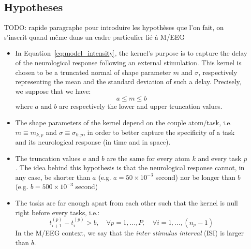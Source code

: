 \subsection{Hypotheses}

TODO: rapide paragraphe pour introduire les hypothèses que l'on fait, on s'inscrit quand même dans un cadre particulier lié à M/EEG

\begin{itemize}
    \item In Equation~\eqref{eq:model_intensity}, the kernel's purpose is to capture the delay of the neurological response following an external stimulation.
    This kernel is chosen to be a truncated normal of shape parameter $m$ and $\sigma$, respectively representing the mean and the standard deviation of such a delay.
    Precisely, we suppose that we have:
    \begin{equation}\label{eq:m_in_between}
        a \leq m \leq b
    \end{equation}
    where $a$ and $b$ are respectively the lower and upper truncation values.
    
    \item The shape parameters of the kernel depend on the couple atom/task, i.e. $m\equiv m_{k,p}$ and $\sigma \equiv \sigma_{k,p}$, in order to better capture the specificity of a task and its neurological response (in time and in space).
    
    \item The truncation values $a$ and $b$ are the same for every atom $k$ and every task $p$.
    The idea behind this hypothesis is that the neurological response cannot, in any case, be shorter than $a$ (e.g. $a = 50\times 10^{-3}$ second) nor be longer than $b$ (e.g. $b = 500\times 10^{-3}$ second)
    
    \item The tasks are far enough apart from each other such that the kernel is null right before every tasks, i.e.:
    \begin{equation}\label{eq:separated_timestamps}
        t_{i+1}^{(p)} - t_i^{(p)} > b, \quad \forall p=1,\dots,P, \quad \forall i=1,\dots, (n_p-1)
    \end{equation}
    In the M/EEG context, we say that the \textit{inter stimulus interval} (ISI) is larger than $b$.
    

\end{itemize}
